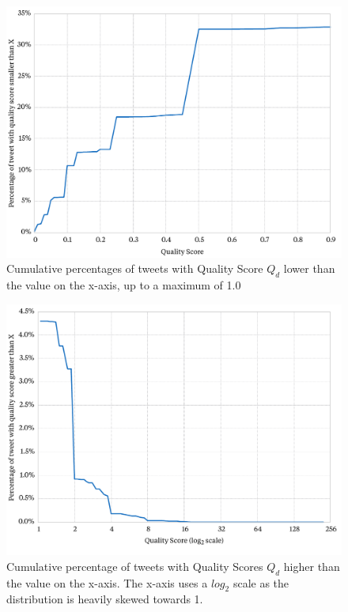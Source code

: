 \begin{figure}[h!]
	\centering
	\includegraphics[width=\textwidth]{Chapters/Newsworthiness/data/negativescores.pdf}
	\caption{Cumulative percentages of tweets with Quality Score \(Q_d\) lower than the value on the x-axis, up to a maximum of 1.0}
	\label{scoring:graphic:lowQualityScores}
\end{figure}

\begin{figure}[h!]
	\centering
	\includegraphics[width=\textwidth]{Chapters/Newsworthiness/data/positivescores.pdf}
	\caption[Cumulative percentage of tweets with Quality Scores \(Q_d\) higher than the value on the x-axis]{Cumulative percentage of tweets with Quality Scores \(Q_d\) higher than the value on the x-axis. The x-axis uses a \(log_2\) scale as the distribution is heavily skewed towards 1.}
	\label{scoring:graphic:highQualityScores}
\end{figure}


